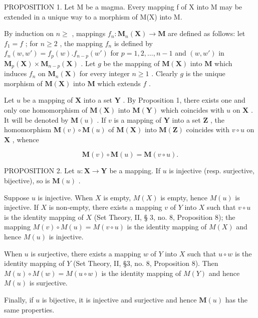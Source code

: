 PROPOSITION 1. Let M be a magma. Every mapping f of X into M may be extended in a unique way to a morphism of M(X) into M.

By induction on \(n \geqslant\) , mappings \(f_n: \mathbf{M}_n(\mathbf{X}) \to \mathbf{M}\) are defined as follows: let \(f_{1} = f\) ; for \(n \geqslant 2\) , the mapping \(f_{n}\) is defined by \(f_{n}(w, w') = f_{p}(w).f_{n-p}(w')\) for \(p = 1, 2, \ldots, n - 1\) and \((w, w')\) in \(\mathbf{M}_{p}(\mathbf{X}) \times \mathbf{M}_{n-p}(\mathbf{X})\) . Let \(g\) be the mapping of \(\mathbf{M}(\mathbf{X})\) into \(\mathbf{M}\) which induces \(f_{n}\) on \(\mathbf{M}_{n}(\mathbf{X})\) for every integer \(n \geqslant 1\) . Clearly \(g\) is the unique morphism of \(\mathbf{M}(\mathbf{X})\) into \(\mathbf{M}\) which extends \(f\) .

Let \(u\) be a mapping of \(\mathbf{X}\) into a set \(\mathbf{Y}\) . By Proposition 1, there exists one and only one homomorphism of \(\mathbf{M}(\mathbf{X})\) into \(\mathbf{M}(\mathbf{Y})\) which coincides with \(u\) on \(\mathbf{X}\) . It will be denoted by \(\mathbf{M}(u)\) . If \(v\) is a mapping of \(\mathbf{Y}\) into a set \(\mathbf{Z}\) , the homomorphism \(\mathbf{M}(v) \circ \mathbf{M}(u)\) of \(\mathbf{M}(\mathbf{X})\) into \(\mathbf{M}(\mathbf{Z})\) coincides with \(v \circ u\) on \(\mathbf{X}\) , whence

\[
\mathbf {M} (v) \circ \mathbf {M} (u) = \mathbf {M} (v \circ u).
\]

PROPOSITION 2. Let \(u: \mathbf{X} \to \mathbf{Y}\) be a mapping. If \(u\) is injective (resp. surjective, bijective), so is \(\mathbf{M}(u)\) .

Suppose \(u\) is injective. When \(X\) is empty, \(M(X)\) is empty, hence \(M(u)\) is injective. If \(X\) is non-empty, there exists a mapping \(v\) of \(Y\) into \(X\) such that \(v \circ u\) is the identity mapping of \(X\) (Set Theory, II, § 3, no. 8, Proposition 8); the mapping \(M(v) \circ M(u) = M(v \circ u)\) is the identity mapping of \(M(X)\) and hence \(M(u)\) is injective.

When \(u\) is surjective, there exists a mapping \(w\) of \(Y\) into \(X\) such that \(u \circ w\) is the identity mapping of \(Y\) (Set Theory, II, §3, no. 8, Proposition 8). Then \(M(u) \circ M(w) = M(u \circ w)\) is the identity mapping of \(M(Y)\) and hence \(M(u)\) is surjective.

Finally, if \(u\) is bijective, it is injective and surjective and hence \(\mathbf{M}(u)\) has the same properties.

